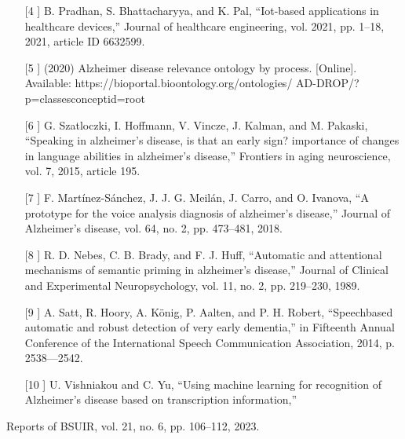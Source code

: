 \documentclass[10pt, a4paper]{article}
\begin{document}
\begin{SCn}
\begin{small}
\begin{multicols}{2}
\begin{enumerate}
systematic review,” Journal of medical Internet research, vol. 20,
no. 2, 2018, article e41.
\vspace{-0.19cm}
\item [[4]] B. Pradhan, S. Bhattacharyya, and K. Pal, “Iot-based applications
in healthcare devices,” Journal of healthcare engineering, vol.
2021, pp. 1–18, 2021, article ID 6632599.
\vspace{-0.45cm}
 \item [[5]] (2020) Alzheimer disease relevance ontology by process.
[Online]. Available: https://bioportal.bioontology.org/ontologies/
AD-DROP/?p=classesconceptid=root
\vspace{-0.19cm}
\item [[6]]  G. Szatloczki, I. Hoffmann, V. Vincze, J. Kalman, and M. Pakaski,
“Speaking in alzheimer’s disease, is that an early sign? importance
of changes in language abilities in alzheimer’s disease,” Frontiers
in aging neuroscience, vol. 7, 2015, article 195.
\vspace{-0.19cm}
\item [[7]] F. Martínez-Sánchez, J. J. G. Meilán, J. Carro, and O. Ivanova, “A
prototype for the voice analysis diagnosis of alzheimer’s disease,”
Journal of Alzheimer’s disease, vol. 64, no. 2, pp. 473–481, 2018.
\vspace{-0.1cm}
\item [[8]] R. D. Nebes, C. B. Brady, and F. J. Huff, “Automatic and attentional mechanisms of semantic priming in alzheimer’s disease,”
Journal of Clinical and Experimental Neuropsychology, vol. 11,
no. 2, pp. 219–230, 1989.
\vspace{-0.2cm}
\item [[9]] A. Satt, R. Hoory, A. König, P. Aalten, and P. H. Robert, “Speechbased automatic and robust detection of very early dementia,” in
Fifteenth Annual Conference of the International Speech Communication Association, 2014, p. 2538––2542.
\vspace{-0.19cm}
\item [[10]] U. Vishniakou and C. Yu, “Using machine learning for recognition of Alzheimer’s disease based on transcription information,”
\end{enumerate}
Reports of BSUIR, vol. 21, no. 6, pp. 106–112, 2023.\\
\begin{center}
    


\end{center}
\end{multicols}
\end{small}
\end{SCn}
\end{document}
